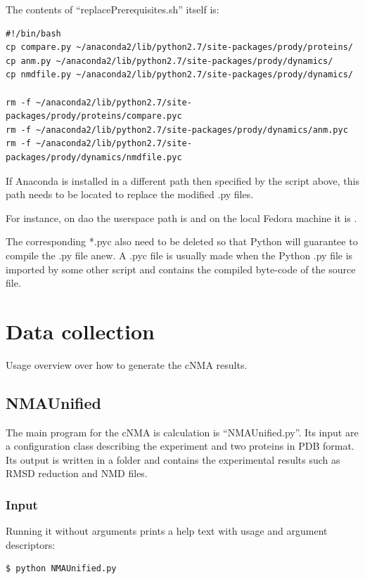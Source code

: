 \documentclass[11pt]{article}
\begin{document}
The contents of ``replacePrerequisites.sh'' itself is:
\begin{lstlisting}
#!/bin/bash
cp compare.py ~/anaconda2/lib/python2.7/site-packages/prody/proteins/
cp anm.py ~/anaconda2/lib/python2.7/site-packages/prody/dynamics/
cp nmdfile.py ~/anaconda2/lib/python2.7/site-packages/prody/dynamics/

rm -f ~/anaconda2/lib/python2.7/site-packages/prody/proteins/compare.pyc
rm -f ~/anaconda2/lib/python2.7/site-packages/prody/dynamics/anm.pyc
rm -f ~/anaconda2/lib/python2.7/site-packages/prody/dynamics/nmdfile.pyc
\end{lstlisting}

If Anaconda is installed in a different path then specified by the script above, this path needs to be located to replace the modified .py files.

For instance, on dao the userspace path is  and on the local Fedora machine it is .

The corresponding *.pyc also need to be deleted so that Python will guarantee to compile the .py file anew. A .pyc file is usually made when the Python .py file is imported by some other script and contains the compiled byte-code of the source file.



\section{Data collection}
\label{sec:data_collection}
Usage overview over how to generate the cNMA results.

\subsection{NMAUnified}
The main program for the cNMA is calculation is ``NMAUnified.py''. Its input are a configuration class describing the experiment and two proteins in PDB format. Its output is written in a folder and contains the experimental results such as RMSD reduction and NMD files. 

\subsubsection{Input}
Running it without arguments prints a help text with usage and argument descriptors:

\begin{lstlisting}
$ python NMAUnified.py
\end{lstlisting}
\end{document}
